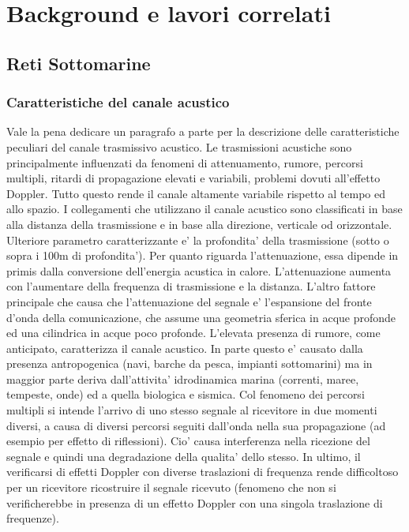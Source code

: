 \documentclass[Lau,binding=0.6cm]{sapthesis}
\begin{document}
\chapter{Background e lavori correlati}

\section{Reti Sottomarine}

\subsection{Caratteristiche del canale acustico}
Vale la pena dedicare un paragrafo a parte per la descrizione delle caratteristiche peculiari del canale trasmissivo acustico. Le trasmissioni acustiche sono principalmente influenzati da fenomeni di attenuamento, rumore, percorsi multipli, ritardi di propagazione elevati e variabili, problemi dovuti all'effetto Doppler.\newline
Tutto questo rende il canale altamente variabile rispetto al tempo ed allo spazio. I collegamenti che utilizzano il canale acustico sono classificati  in base alla distanza della trasmissione e in base alla direzione, verticale od orizzontale. Ulteriore parametro caratterizzante e' la profondita' della trasmissione (sotto o sopra i 100m di profondita').\newline
Per quanto riguarda l'attenuazione, essa dipende in primis dalla conversione dell'energia acustica in calore. L'attenuazione aumenta con l'aumentare della frequenza di trasmissione e la distanza. 
L'altro fattore principale che causa che l'attenuazione del segnale e' l'espansione del fronte d'onda della comunicazione, che assume una geometria sferica in acque profonde ed una cilindrica in acque poco profonde.\newline
L'elevata presenza di rumore, come anticipato, caratterizza il canale acustico. In parte questo e' causato dalla presenza antropogenica (navi, barche da pesca, impianti sottomarini) ma in maggior parte deriva dall'attivita' idrodinamica marina (correnti, maree, tempeste, onde) ed a quella biologica e sismica.\newline
Col fenomeno dei percorsi multipli si intende l'arrivo di uno stesso segnale al ricevitore in due momenti diversi, a causa di diversi percorsi seguiti dall'onda nella sua propagazione (ad esempio per effetto  di riflessioni). Cio' causa interferenza nella ricezione del segnale e quindi una degradazione della qualita' dello stesso.\newline
In ultimo, il verificarsi di effetti Doppler con diverse traslazioni di frequenza rende difficoltoso per un ricevitore ricostruire il segnale ricevuto (fenomeno che non si verificherebbe in presenza di un effetto Doppler con una singola traslazione di frequenze).
\end{document}
